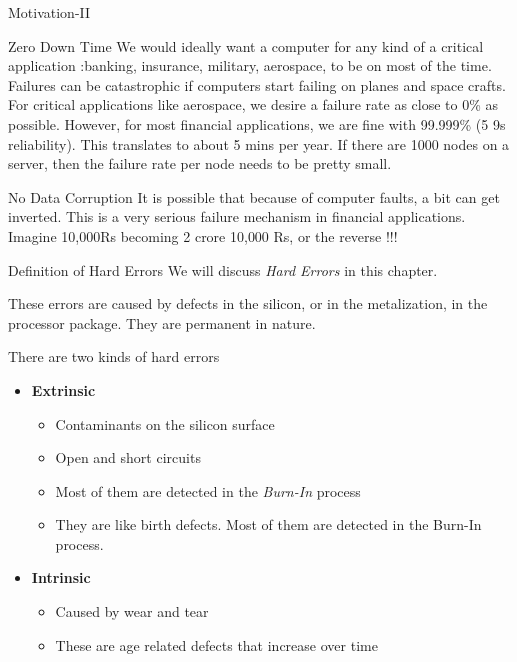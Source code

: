\documentclass[xcolor=pdftex,dvipsnames,table,svgnames,x11names]{beamer}
\begin{document}
\begin{frame}[shrink]{Motivation-II}
  \begin{block}{Zero Down Time}
    We would ideally want a computer for any kind of a critical application :banking, insurance, military, aerospace, 
    to be on most of the time. Failures can be catastrophic if computers start failing on planes and space crafts. 
    For critical applications like aerospace, we desire a failure rate as close to 0\% as possible. However, for 
    most financial applications, we are fine with 99.999\% (5 9s reliability). This translates to about 5 mins per year.
    If there are 1000 nodes on a server, then the failure rate per node needs to be pretty small.
  \end{block}
  \begin{block}{No Data Corruption}
    It is possible that because of computer faults, a bit can get inverted. This is a very serious failure mechanism
    in financial applications. Imagine 10,000Rs becoming 2 crore 10,000 Rs, or the reverse !!!
  \end{block}
\end{frame}

\begin{frame}[shrink=10]{Definition of Hard Errors}
We will discuss \emph{Hard Errors} in this chapter. 
\begin{definition}
These errors are caused by defects in the silicon, or in the metalization, in the processor package.
They are permanent in nature.
\end{definition}
\pause
There are two kinds of hard errors

\begin{itemize}
 \item \textbf{Extrinsic}
    \begin{itemize}
      \item Contaminants on the silicon surface
      \item Open and short circuits
      \item Most of them are detected in the \textit{Burn-In} process
      \item They are like birth defects. Most of them are detected in the Burn-In process.
    \end{itemize}
\pause
 \item \textbf{Intrinsic}
    \begin{itemize}
    \item Caused by wear and tear
    \item These are age related defects that increase over time
    \end{itemize}
\end{itemize}
\end{frame}
\end{document}
